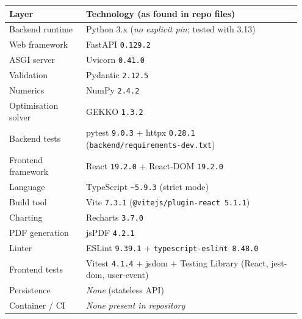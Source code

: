 \documentclass[11pt,a4paper]{article}
\begin{document}
\begin{longtable}{@{}p{0.25\linewidth} p{0.7\linewidth}@{}}
\toprule
\textbf{Layer} & \textbf{Technology (as found in repo files)} \\
\midrule
Backend runtime     & Python 3.x (\emph{no explicit pin}; tested with 3.13) \\
Web framework       & FastAPI \texttt{0.129.2} \\
ASGI server         & Uvicorn \texttt{0.41.0} \\
Validation          & Pydantic \texttt{2.12.5} \\
Numerics            & NumPy \texttt{2.4.2} \\
Optimisation solver & GEKKO \texttt{1.3.2} \\
Backend tests       & pytest \texttt{9.0.3} + httpx \texttt{0.28.1}
                      (\texttt{backend/requirements-dev.txt}) \\
Frontend framework  & React \texttt{19.2.0} + React-DOM \texttt{19.2.0} \\
Language            & TypeScript \texttt{\textasciitilde{}5.9.3} (strict mode) \\
Build tool          & Vite \texttt{7.3.1} (\texttt{@vitejs/plugin-react 5.1.1}) \\
Charting            & Recharts \texttt{3.7.0} \\
PDF generation      & jsPDF \texttt{4.2.1} \\
Linter              & ESLint \texttt{9.39.1} + \texttt{typescript-eslint 8.48.0} \\
Frontend tests      & Vitest \texttt{4.1.4} + jsdom + Testing Library (React,
                      jest-dom, user-event) \\
Persistence         & \emph{None} (stateless API) \\
Container / CI      & \emph{None present in repository} \\
\bottomrule
\end{longtable}
\end{document}
